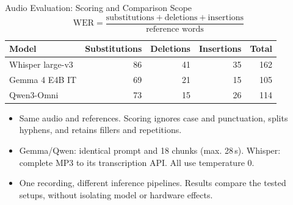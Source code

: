 \documentclass[aspectratio=169,12pt]{beamer}
\begin{document}
\begin{frame}{Audio Evaluation: Scoring and Comparison Scope}
\small
\[
\mathrm{WER} = \frac{\text{substitutions} + \text{deletions} + \text{insertions}}{\text{reference words}}
\]
\centering
\begin{tabular}{lrrrr}
\toprule
Model & Substitutions & Deletions & Insertions & Total \\
\midrule
Whisper large-v3 & 86 & 41 & 35 & 162 \\
Gemma 4 E4B IT & 69 & 21 & 15 & 105 \\
Qwen3-Omni & 73 & 15 & 26 & 114 \\
\bottomrule
\end{tabular}
\vspace{0.3em}

\raggedright
\begin{itemize}
\setlength{\itemsep}{0pt}
\item Same audio and references. Scoring ignores case and punctuation, splits hyphens, and retains fillers and repetitions.
\item Gemma/Qwen: identical prompt and 18 chunks (max. 28\,s). Whisper: complete MP3 to its transcription API. All use temperature 0.
\item One recording, different inference pipelines. Results compare the tested setups, without isolating model or hardware effects.
\end{itemize}
\end{frame}

\end{document}
